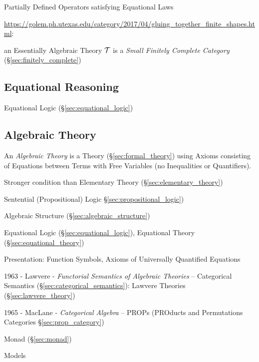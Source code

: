 Partially Defined Operators satisfying Equational Laws

\url{https://golem.ph.utexas.edu/category/2017/04/gluing_together_finite_shapes.html}:

an Essentially Algebraic Theory $\mathcal{T}$ is a \emph{Small Finitely
  Complete Category} (\S\ref{sec:finitely_complete})



\subsection{Equational Reasoning}\label{sec:equational_reasoning}

Equational Logic (\S\ref{sec:equational_logic})



\subsection{Algebraic Theory}\label{sec:algebraic_theory}

An \emph{Algebraic Theory} is a Theory (\S\ref{sec:formal_theory})
using Axioms consisting of Equations between Terms with Free Variables
(no Inequalities or Quantifiers).

Stronger condition than Elementary Theory
(\S\ref{sec:elementary_theory})

Sentential (Propositional) Logic \S\ref{sec:propositional_logic})

Algebraic Structure (\S\ref{sec:algebraic_structure})

Equational Logic (\S\ref{sec:equational_logic}),
Equational Theory (\S\ref{sec:equational_theory})

Presentation: Function Symbols, Axioms of Universally Quantified
Equations

1963 - Lawvere - \emph{Functorial Semantics of Algebraic Theories} --
Categorical Semantics (\S\ref{sec:categorical_semantics}): Lawvere Theories
(\S\ref{sec:lawvere_theory})

1965 - MacLane - \emph{Categorical Algebra} -- PROPs (PROducts and Permutations
Categories \S\ref{sec:prop_category})

Monad (\S\ref{sec:monad})

Models

